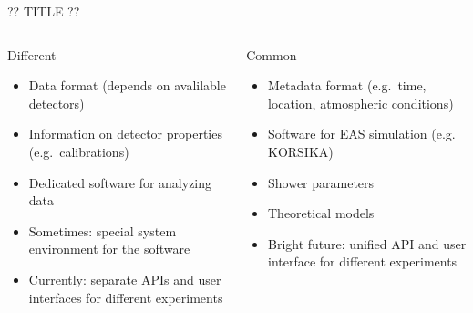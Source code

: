 \documentclass[18pt]{beamer}
\begin{document}
%

\begin{frame}{?? TITLE ??}
\begin{columns}
  \begin{column}[t]{0.49\textwidth}
    \begin{block}{Different}
      \begin{itemize}
        \item Data format (depends on avalilable detectors)
        \item Information on detector properties (e.g.\ calibrations)
        \item Dedicated software for analyzing data
        \item Sometimes: special system environment for the software
        \item \textcolor{red!50!black}{Currently}: separate APIs and user interfaces for different experiments
      \end{itemize}
    \end{block}
  \end{column}
  \hfill
  \begin{column}[t]{0.49\textwidth}
    \begin{block}{Common}
      \begin{itemize}
        \item Metadata format (e.g.\ time, location, atmospheric conditions)
        \item Software for EAS simulation (e.g. KORSIKA)
        \item Shower parameters
        \item Theoretical models
        \item \textcolor{blue!50!black}{Bright future}: unified API and user interface for different experiments
      \end{itemize}
    \end{block}
  \end{column}
\end{columns}
\end{frame}
\end{document}
